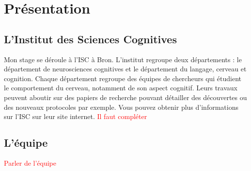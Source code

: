 \section{Présentation}

\subsection{L'Institut des Sciences Cognitives}

Mon stage se déroule à l'\gls{ISC} à Bron. L'institut regroupe deux départements : le département de neurosciences cognitives et le département du langage, cerveau et cognition.
Chaque département regroupe des équipes de chercheurs qui étudient le comportement du cerveau, notamment de son aspect cognitif. Leurs travaux peuvent aboutir sur des papiers de
recherche pouvant détailler des découvertes ou des nouveaux protocoles par exemple. Vous pouvez obtenir plus d'informations sur l'\gls{ISC} sur leur site internet\cite{ISC00}.
\textcolor{red}{Il faut compléter}

\subsection{L'équipe}\textcolor{red}{Parler de l'équipe}

\newpage